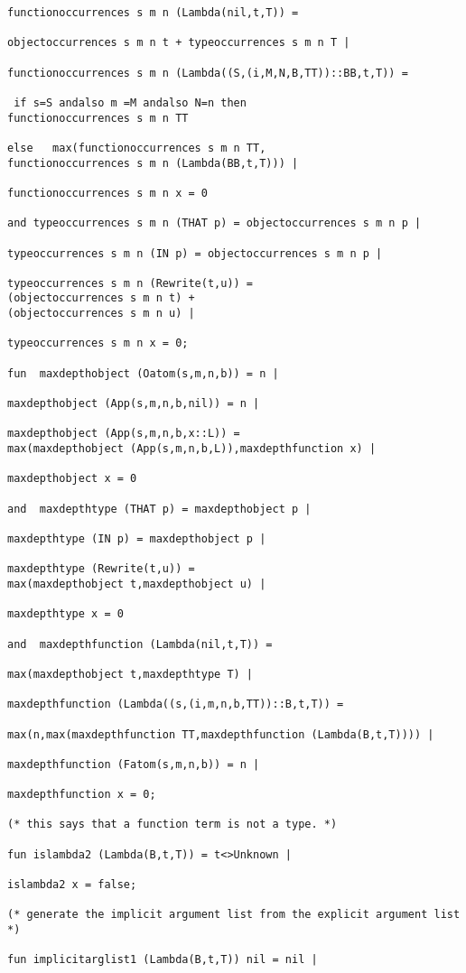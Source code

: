 \documentclass[12pt]{article}
\begin{document}
\begin{verbatim}
functionoccurrences s m n (Lambda(nil,t,T)) =

objectoccurrences s m n t + typeoccurrences s m n T |

functionoccurrences s m n (Lambda((S,(i,M,N,B,TT))::BB,t,T)) =

 if s=S andalso m =M andalso N=n then 
functionoccurrences s m n TT 

else   max(functionoccurrences s m n TT,
functionoccurrences s m n (Lambda(BB,t,T))) |

functionoccurrences s m n x = 0

and typeoccurrences s m n (THAT p) = objectoccurrences s m n p |

typeoccurrences s m n (IN p) = objectoccurrences s m n p |

typeoccurrences s m n (Rewrite(t,u)) =
(objectoccurrences s m n t) + 
(objectoccurrences s m n u) |

typeoccurrences s m n x = 0;

fun  maxdepthobject (Oatom(s,m,n,b)) = n |

maxdepthobject (App(s,m,n,b,nil)) = n |

maxdepthobject (App(s,m,n,b,x::L)) = 
max(maxdepthobject (App(s,m,n,b,L)),maxdepthfunction x) | 

maxdepthobject x = 0

and  maxdepthtype (THAT p) = maxdepthobject p |

maxdepthtype (IN p) = maxdepthobject p | 

maxdepthtype (Rewrite(t,u)) =
max(maxdepthobject t,maxdepthobject u) |

maxdepthtype x = 0 

and  maxdepthfunction (Lambda(nil,t,T)) =

max(maxdepthobject t,maxdepthtype T) |

maxdepthfunction (Lambda((s,(i,m,n,b,TT))::B,t,T)) =

max(n,max(maxdepthfunction TT,maxdepthfunction (Lambda(B,t,T)))) |

maxdepthfunction (Fatom(s,m,n,b)) = n | 

maxdepthfunction x = 0;

(* this says that a function term is not a type. *)

fun islambda2 (Lambda(B,t,T)) = t<>Unknown |

islambda2 x = false;

(* generate the implicit argument list from the explicit argument list *)

fun implicitarglist1 (Lambda(B,t,T)) nil = nil |


\end{verbatim}
\end{document}
